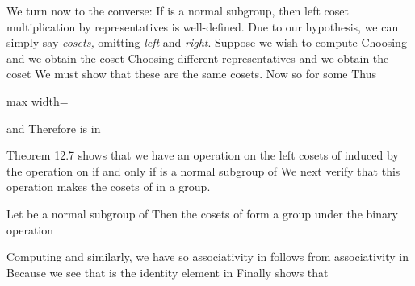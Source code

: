 \documentclass[11pt,oneside]{article}
\begin{document}
\begin{BookBody}
We turn now to the converse: If  is a normal subgroup, then left coset multiplication by representatives is well-defined. Due to our hypothesis, we can simply say\textit{ cosets,} omitting\textit{ left} and\textit{ right}. Suppose we wish to compute  Choosing  and  we obtain the coset  Choosing different representatives  and  we obtain the coset  We must show that these are the same cosets. Now  so  for some  Thus

\begin{center}\begin{adjustbox}{max width=\linewidth}\end{adjustbox}\end{center}

\noindent and  Therefore is in  \BookEnd{\blacklozenge}

Theorem 12.7 shows that we have an operation on the left cosets of  induced by the operation on  if and only if  is a normal subgroup of  We next verify that this operation makes  the cosets of  in  a group.

 Let  be a normal subgroup of  Then the cosets of  form a group  under the binary operation \BookEnd{\blacktriangle}

 Computing and similarly, we have  so associativity in  follows from associativity in  Because  we see that  is the identity element in  Finally  shows that \BookEnd{\blacklozenge}


\end{BookBody}
\end{document}
